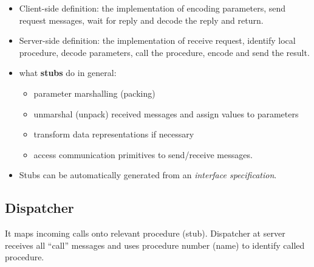 \documentclass[twocolumn,landscape,10pt]{article}
\theoremstyle{definition}
\begin{document}
\begin{itemize}
    \item Client-side definition: the implementation of encoding parameters,
        send request messages, wait for reply and decode the reply and return.
    \item Server-side definition: the implementation of receive request,
        identify local procedure, decode parameters, call the
        procedure, encode and send the result.
    \item what \textbf{stubs} do in general:
        \begin{itemize}
            \item parameter marshalling (packing)
            \item unmarshal (unpack) received messages and assign values to
                parameters
            \item transform data representations if necessary
            \item access communication primitives to send/receive messages.
        \end{itemize} 
    \item Stubs can be automatically generated from an \emph{interface
        specification}.
\end{itemize} 

\subsection{Dispatcher}

It maps incoming calls onto relevant procedure (stub).
Dispatcher at server receives all ``call'' messages and uses procedure
number (name) to identify called procedure.
\end{document}
